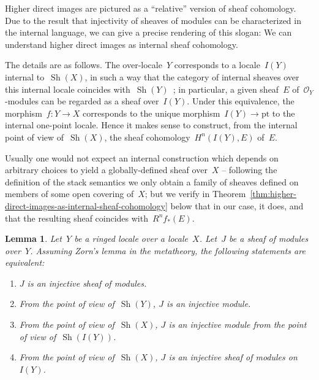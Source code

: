 \documentclass[oneside]{amsart}
\theoremstyle{definition}
\theoremstyle{plain}
\newtheorem{lemma}[defn]{Lemma}
\theoremstyle{remark}
\renewcommand{\O}{\mathcal{O}}
\DeclareMathOperator{\Sh}{Sh}
\renewcommand{\_}{\mathpunct{.}\,}
\begin{document}
Higher direct images are pictured as a ``relative'' version of sheaf
cohomology. Due to the result that injectivity of sheaves of modules can be
characterized in the internal language, we can give a precise
rendering of this slogan: We can understand higher direct images as
internal sheaf cohomology.

The details are as follows. The over-locale~$Y$ corresponds to a locale~$I(Y)$ internal to~$\Sh(X)$, in
such a way that the category of internal sheaves over this internal locale
coincides with~$\Sh(Y)$~\cite[Scholium~C1.6.4]{johnstone:elephant}; in particular, a given sheaf~$E$ of~$\O_Y$-modules can
be regarded as a sheaf over~$I(Y)$. Under this equivalence, the morphism~$f : Y
\to X$ corresponds to the unique morphism~$I(Y) \to \mathrm{pt}$ to the
internal one-point locale. Hence it makes sense to construct, from the internal
point of view of~$\Sh(X)$, the sheaf cohomology~$H^n(I(Y), E)$ of~$E$.

Usually one would not expect an internal construction which depends on
arbitrary choices to yield a globally-defined sheaf over~$X$ -- following the
definition of the stack semantics we only obtain a family of sheaves defined on
members of some open covering of~$X$; but we verify in
Theorem~\ref{thm:higher-direct-images-as-internal-sheaf-cohomology} below that in our
case, it does, and that the resulting sheaf coincides with~$R^n f_*(E)$.

\begin{lemma}\label{lemma:notions-of-internal-injectivity}
Let~$Y$ be a ringed locale over a locale~$X$. Let~$J$ be a sheaf of modules over~$Y$.
Assuming Zorn's lemma in the metatheory, the following statements are equivalent:
\begin{enumerate}
\item $J$ is an injective sheaf of modules.
\item From the point of view of~$\Sh(Y)$, $J$ is an injective module.
\item From the point of view of~$\Sh(X)$, $J$ is an injective module from the
point of view of~$\Sh(I(Y))$.
\item From the point of view of~$\Sh(X)$, $J$ is an injective sheaf of modules
on~$I(Y)$.
\end{enumerate}
\end{lemma}
\end{document}
